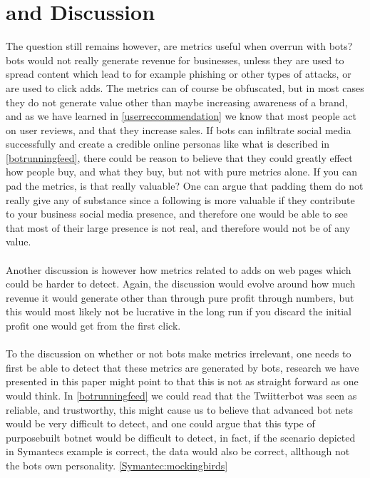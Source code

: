 \section{and Discussion}
The question still remains however, are metrics useful when overrun with bots? bots would not really generate revenue for businesses, unless they are used to spread content which lead to for example phishing or other types of attacks, or are used to click adds. The metrics can of course be obfuscated, but in most cases they do not generate value other than maybe increasing awareness of a brand, and as we have learned in \ref{userreccommendation} we know that most people act on user reviews, and that they increase sales. If bots can infiltrate social media successfully and create a credible online personas like what is described in \ref{botrunningfeed}, there could be reason to believe that they could greatly effect how people buy, and what they buy, but not with pure metrics alone. If you can pad the metrics, is that really valuable? One can argue that padding them do not really give any of substance since a following is more valuable if they contribute to your business social media presence, and therefore one would be able to see that most of their large presence is not real, and therefore would not be of any value. 
\\
\\
Another discussion is however how metrics related to adds on web pages which could be harder to detect. Again, the discussion would evolve around how much revenue it would generate other than through pure profit through numbers, but this would most likely not be lucrative in the long run if you discard the initial profit one would get from the first click.
\\
\\
To the discussion on whether or not bots make metrics irrelevant, one needs to first be able to detect that these metrics are generated by bots, research we have presented in this paper might point to that this is not as straight forward as one would think. In \ref{botrunningfeed} we could read that the Twiitterbot was seen as reliable, and trustworthy, this might cause us to believe that advanced bot nets would be very difficult to detect, and one could argue that this type of purposebuilt botnet would be difficult to detect, in fact, if the scenario depicted in Symantecs example is correct, the data would also be correct, allthough not the bots own personality. \ref{Symantec:mockingbirds}


